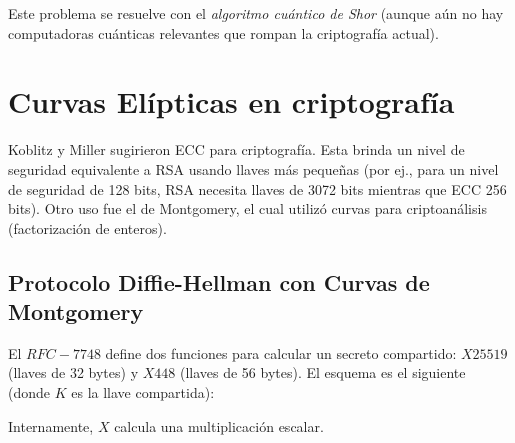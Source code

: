   Este problema se resuelve con el \textit{algoritmo cuántico de Shor} (aunque aún no hay 
  computadoras cuánticas relevantes que rompan la criptografía actual).

  \section{Curvas Elípticas en criptografía}
  Koblitz y Miller sugirieron ECC para criptografía.
  Esta brinda un nivel de seguridad equivalente a RSA usando llaves más pequeñas 
  (por ej., para un nivel de seguridad de 128 bits, RSA necesita llaves de 3072 bits mientras 
  que ECC 256 bits).
  Otro uso fue el de Montgomery, el cual utilizó curvas para criptoanálisis (factorización de enteros).

  \subsection{Protocolo Diffie-Hellman con Curvas de Montgomery}
  El $RFC-7748$ define dos funciones para calcular un secreto compartido:
  $X25519$ (llaves de 32 bytes) y $X448$ (llaves de 56 bytes).
  El esquema es el siguiente (donde $K$ es la llave compartida):

  \begin{center}
  \end{center}
  \begin{remark}
    Internamente, $X$ calcula una multiplicación escalar.
  \end{remark}


